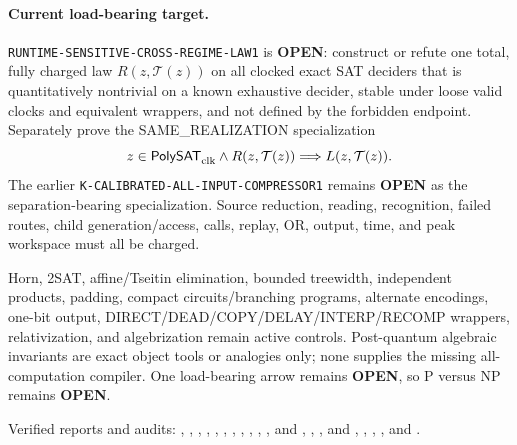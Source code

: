 \documentclass[11pt]{article}
\begin{document}
\paragraph{Current load-bearing target.}
\texttt{RUNTIME-SENSITIVE-CROSS-REGIME-LAW1} is \textbf{OPEN}: construct or
refute one total, fully charged law \(R(z,\mathcal T(z))\) on all clocked
exact SAT deciders that is quantitatively nontrivial on a known exhaustive
decider, stable under loose valid clocks and equivalent wrappers, and not
defined by the forbidden endpoint.  Separately prove the SAME\_REALIZATION
specialization
\[
 z\in\mathsf{PolySAT}_{\rm clk}\land R(z,\mathcal T(z))
 \Longrightarrow L(z,\mathcal T(z)).
\]
The earlier \texttt{K-CALIBRATED-ALL-INPUT-COMPRESSOR1} remains
\textbf{OPEN} as the separation-bearing specialization.  Source reduction,
reading, recognition, failed routes, child generation/access, calls, replay,
OR, output, time, and peak workspace must all be charged.

Horn, 2SAT, affine/Tseitin elimination, bounded treewidth, independent
products, padding, compact circuits/branching programs, alternate encodings,
one-bit output, DIRECT/DEAD/COPY/DELAY/INTERP/RECOMP wrappers, relativization,
and algebrization remain active controls.  Post-quantum algebraic invariants
are exact object tools or analogies only; none supplies the missing
all-computation compiler.  One load-bearing arrow remains \textbf{OPEN}, so P
versus NP remains \textbf{OPEN}.

Verified reports and audits:
,
,
,
,
,
,
,
,
,
,
, and
,
,
, and
,
,
,
, and
.
\end{document}
